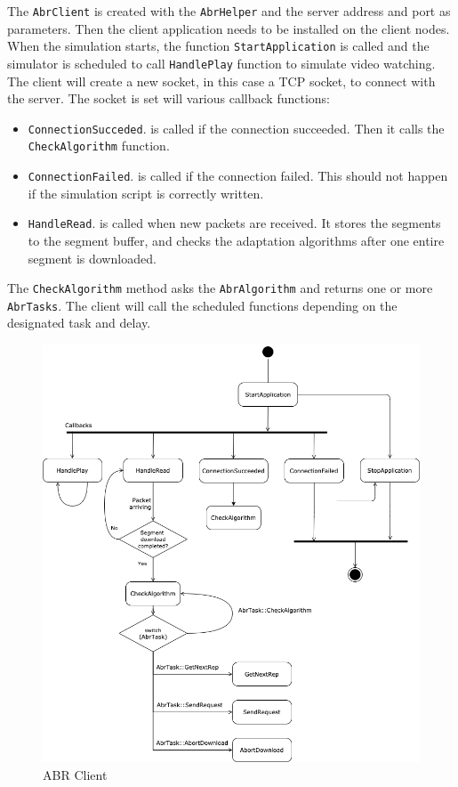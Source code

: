 The \texttt{AbrClient} is created with the \texttt{AbrHelper} and the server address and port as
parameters.
Then the client application needs to be installed
on the client nodes. When the simulation starts, the function \texttt{StartApplication} is called
and the simulator is scheduled to call \texttt{HandlePlay} function to simulate video watching.
The client will create a new socket, in this case a TCP socket, to connect with the server.
The socket is set will various callback functions:
\begin{itemize}[noitemsep,topsep=0pt]
  \item \texttt{ConnectionSucceded}. is called if the connection succeeded. Then it calls
  the \texttt{CheckAlgorithm} function.
  \item \texttt{ConnectionFailed}. is called if the connection failed. This should not 
  happen if the simulation script is correctly written.
  \item \texttt{HandleRead}. is called when new packets are received. It stores the segments 
  to the segment buffer, and checks the adaptation algorithms after one entire segment is downloaded.
\end{itemize}

The \texttt{CheckAlgorithm} method asks the \texttt{AbrAlgorithm} and returns
one or more \texttt{AbrTasks}. The client will call the scheduled 
functions depending on the designated task and delay.

\begin{figure}[]
  \centering
  \includegraphics[width=\textwidth]{img/abrclient.png}
  \caption{ABR Client}
  \label{fig:abrclient}
\end{figure}

